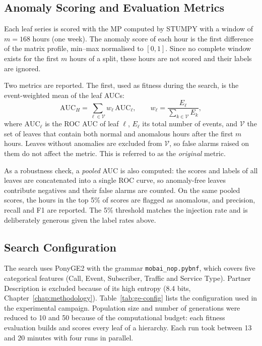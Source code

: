\subsection{Anomaly Scoring and Evaluation Metrics}

Each leaf series is scored with the \ac{MP} computed by STUMPY \parencite{law2019stumpy} with a window of $m = 168$ hours (one week).
The anomaly score of each hour is the first difference of the matrix profile, min--max normalised to $[0, 1]$.
Since no complete window exists for the first $m$ hours of a split, these hours are not scored and their labels are ignored.

Two metrics are reported.
The first, used as fitness during the search, is the event-weighted mean of the leaf \ac{AUC}s:
\begin{equation}
    \mathrm{AUC}_{H} = \sum_{\ell \in \mathcal{V}} w_\ell \, \mathrm{AUC}_\ell,
    \qquad
    w_\ell = \frac{E_\ell}{\sum_{k \in \mathcal{V}} E_k},
    \label{eq:weighted-auc}
\end{equation}
where $\mathrm{AUC}_\ell$ is the \ac{ROC} \ac{AUC} of leaf $\ell$, $E_\ell$ its total number of events, and $\mathcal{V}$ the set of leaves that contain both normal and anomalous hours after the first $m$ hours.
Leaves without anomalies are excluded from $\mathcal{V}$, so false alarms raised on them do not affect the metric.
This is referred to as the \emph{original} metric.

As a robustness check, a \emph{pooled} \ac{AUC} is also computed: the scores and labels of all leaves are concatenated into a single \ac{ROC} curve, so anomaly-free leaves contribute negatives and their false alarms are counted.
On the same pooled scores, the hours in the top 5\% of scores are flagged as anomalous, and precision, recall and F1 are reported.
The 5\% threshold matches the injection rate and is deliberately generous given the label rates above.

\subsection{Search Configuration}

The search uses PonyGE2 \parencite{fenton2017} with the grammar \texttt{mobai\_nop.pybnf}, which covers five categorical features (Call, Event, Subscriber, Traffic and Service Type).
Partner Description is excluded because of its high entropy (8.4 bits, Chapter~\ref{chap:methodology}).
Table~\ref{tab:ge-config} lists the configuration used in the experimental campaign.
Population size and number of generations were reduced to 10 and 50 because of the computational budget: each fitness evaluation builds and scores every leaf of a hierarchy.
Each run took between 13 and 20 minutes with four runs in parallel.

